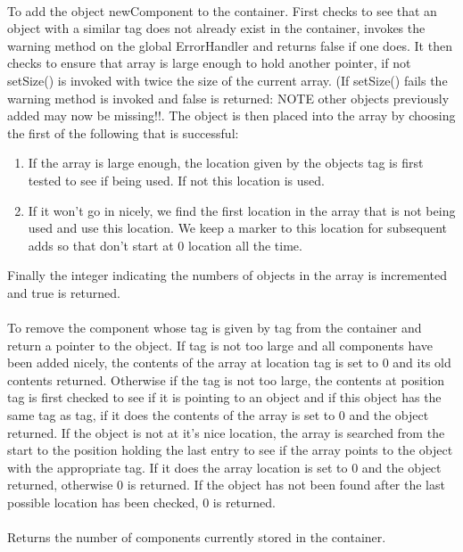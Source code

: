 \\
To add the object \p newComponent to the container. First checks to
see that an object with a similar tag does not already exist in the
container, invokes the warning method on the global ErrorHandler and
returns \p false if one does. It then checks to ensure that array
is large enough to hold another pointer, if not setSize() is
invoked with twice the size of the current array. (If setSize()
fails the warning method is invoked and \p false is returned: NOTE
other objects previously added may now be missing!!. The object is
then placed into the array by choosing the first of the following that
is successful: \begin{enumerate} 
\item If the array is large enough, the location given by the objects
tag is first tested to see if being used. If not this location is
used.
\item If it won't go in nicely, we find the first location in the
array that is not being used and use this location. We keep a marker
to this location for subsequent adds so that don't start at $0$
location all the time.
\end{enumerate}
\noindent Finally the integer indicating the numbers of objects in the array is
incremented and \p true is returned. \\

 
\\
To remove the component whose tag is given by \p tag from the
container and return a pointer to the object. If tag is not too large
and all components have been added nicely, the contents of the array
at location \p tag is set to $0$ and its old contents
returned. Otherwise if the tag is not too large, the contents at
position \p tag is first checked to see if it is pointing to an
object and if this object has the same tag as \p tag, if it does
the contents of the array is set to $0$ and the object returned. If
the object is not at it's nice location, the array is searched from
the start to the position holding the last entry to see if the array
points to the object with the appropriate tag. If it 
does the array location is set to $0$ and the object returned,
otherwise $0$ is returned. If the object has not been found after the
last possible location has been checked, $0$ is returned. \\

\\
Returns the number of components currently stored in the container. \\

